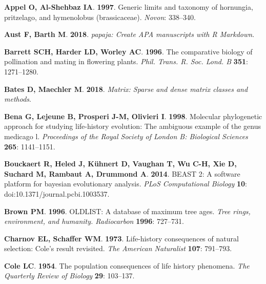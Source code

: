 \documentclass[man,floatsintext]{apa6}
\theoremstyle{definition}
\theoremstyle{definition}
\theoremstyle{definition}
\theoremstyle{remark}
\begin{document}
\leavevmode\hypertarget{ref-appel1997generic}{}%
\textbf{\textnormal{Appel O}, \textnormal{Al-Shehbaz IA}}.
\textbf{1997}. Generic limits and taxonomy of hornungia, pritzelago, and
hymenolobus (brassicaceae). \emph{Novon}: 338--340.

\leavevmode\hypertarget{ref-R-papaja}{}%
\textbf{\textnormal{Aust F}, \textnormal{Barth M}}. \textbf{2018}.
\emph{papaja: Create APA manuscripts with R Markdown}.

\leavevmode\hypertarget{ref-barrett1996comparative}{}%
\textbf{\textnormal{Barrett SCH}, \textnormal{Harder LD},
\textnormal{Worley AC}}. \textbf{1996}. The comparative biology of
pollination and mating in flowering plants. \emph{Phil. Trans. R. Soc.
Lond. B} \textbf{351}: 1271--1280.

\leavevmode\hypertarget{ref-R-Matrix}{}%
\textbf{\textnormal{Bates D}, \textnormal{Maechler M}}. \textbf{2018}.
\emph{Matrix: Sparse and dense matrix classes and methods}.

\leavevmode\hypertarget{ref-bena1998molecular}{}%
\textbf{\textnormal{Bena G}, \textnormal{Lejeune B},
\textnormal{Prosperi J-M}, \textnormal{Olivieri I}}. \textbf{1998}.
Molecular phylogenetic approach for studying life-history evolution: The
ambiguous example of the genus medicago l. \emph{Proceedings of the
Royal Society of London B: Biological Sciences} \textbf{265}:
1141--1151.

\leavevmode\hypertarget{ref-bouckaert2014beast}{}%
\textbf{\textnormal{Bouckaert R}, \textnormal{Heled J},
\textnormal{Kühnert D}, \textnormal{Vaughan T}, \textnormal{Wu C-H},
\textnormal{Xie D}, \textnormal{Suchard M}, \textnormal{Rambaut A},
\textnormal{Drummond A}}. \textbf{2014}. BEAST 2: A software platform
for bayesian evolutionary analysis. \emph{PLoS Computational Biology}
\textbf{10}: doi:10.1371/journal.pcbi.1003537.

\leavevmode\hypertarget{ref-brown1996oldlist}{}%
\textbf{\textnormal{Brown PM}}. \textbf{1996}. OLDLIST: A database of
maximum tree ages. \emph{Tree rings, environment, and humanity.
Radiocarbon} \textbf{1996}: 727--731.

\leavevmode\hypertarget{ref-charnov1973life}{}%
\textbf{\textnormal{Charnov EL}, \textnormal{Schaffer WM}}.
\textbf{1973}. Life-history consequences of natural selection: Cole's
result revisited. \emph{The American Naturalist} \textbf{107}: 791--793.

\leavevmode\hypertarget{ref-cole1954population}{}%
\textbf{\textnormal{Cole LC}}. \textbf{1954}. The population
consequences of life history phenomena. \emph{The Quarterly Review of
Biology} \textbf{29}: 103--137.
\end{document}
